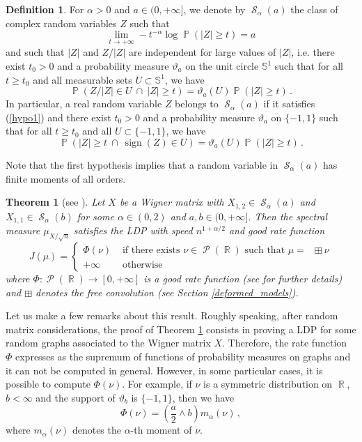 \documentclass[11pt,a4paper]{article}
\DeclareMathOperator{\R}{\mathbb{R}}
\DeclareMathOperator{\PR}{\mathbb{P}}
\DeclareMathOperator{\PP}{\mathcal{P}}
\DeclareMathOperator{\Sz}{\mathcal{S}}
\DeclareMathOperator{\1}{\mathbf{1}}
\DeclareMathOperator{\sgn}{\mathrm{sign}}
\DeclareMathOperator{\musc}{\mu_{\mathrm{sc}}}
\newtheorem{Theorem}[Proposition]{Theorem}
\theoremstyle{definition}
\newtheorem{Definition}[Proposition]{Definition}
\begin{document}
\begin{Definition} \label{S_alpha(a)}
For $\alpha>0$ and $a \in (0,+\infty]$, we denote by $\Sz_{\alpha}(a)$ the class of complex random variables $Z$ such that
\begin{equation} \label{hypo1}
\lim_{t \to +\infty} -t^{-\alpha} \log \PR(|Z| \ge t) = a
\end{equation}
and such that $|Z|$ and $Z/|Z|$ are independent for large values of $|Z|$, i.e. there exist $t_0>0$ and a probability measure $\vartheta_a$ on the unit circle $\mathbb{S}^1$ such that for all $t \ge t_0$ and all measurable sets $U \subset \mathbb{S}^1$, we have
\begin{displaymath}
\PR(Z/|Z| \in U \ \cap \ |Z| \ge t) = \vartheta_a(U) \PR(|Z| \ge t) \, .
\end{displaymath}
In particular, a real random variable $Z$ belongs to $\Sz_{\alpha}(a)$ if it satisfies (\ref{hypo1}) and there exist $t_0>0$ and a probability measure $\vartheta_a$ on $\{-1,1\}$ such that for all $t \ge t_0$ and all $U \subset \{-1,1\}$, we have
\begin{equation} \label{hypo2bis}
\PR(|Z| \ge t \ \cap \ \sgn(Z) \in U) = \vartheta_a(U) \PR(|Z| \ge t) \, .
\end{equation}
\end{Definition}

Note that the first hypothesis implies that a random variable in $\Sz_{\alpha}(a)$ has finite moments of all orders.
\begin{Theorem}[see {\cite[Theorem 1.1]{BC}}] \label{LDP_BC}
Let $X$ be a Wigner matrix with $X_{1,2} \in \Sz_{\alpha}(a)$ and $X_{1,1} \in \Sz_{\alpha}(b)$ for some $\alpha \in (0,2)$ and $a,b \in (0,+\infty]$. Then the spectral measure $\mu_{X/\sqrt{n}}$ satisfies the LDP with speed $n^{1+\alpha/2}$ and good rate function
\begin{displaymath}
J(\mu) = \left\{ \begin{array}{ll}
\Phi(\nu) & \textrm{ if there exists } \nu \in \PP(\R) \textrm{ such that } \mu = \musc \boxplus \nu \\
+\infty & \textrm{ otherwise}
\end{array} \right.
\end{displaymath}
where $\Phi : \PP(\R) \to [0,+\infty]$ is a good rate function (see \cite{BC} for further details) and $\boxplus$ denotes the free convolution (see Section \ref{deformed_models}).
\end{Theorem}
Let us make a few remarks about this result. Roughly speaking, after random matrix considerations, the proof of Theorem \ref{LDP_BC} consists in proving a LDP for some random graphs associated to the Wigner matrix $X$. Therefore, the rate function $\Phi$ expresses as the supremum of functions of probability measures on graphs and it can not be computed in general. However, in some particular cases, it is possible to compute $\Phi(\nu)$. For example, if $\nu$ is a symmetric distribution on $\R$, $b<\infty$ and the support of $\vartheta_b$ is $\{-1,1\}$, then we have
\begin{displaymath}
\Phi(\nu) = \left( \frac{a}{2} \wedge b \right) m_{\alpha}(\nu) \, ,
\end{displaymath}
where $m_{\alpha}(\nu)$ denotes the $\alpha$-th moment of $\nu$.
\end{document}
